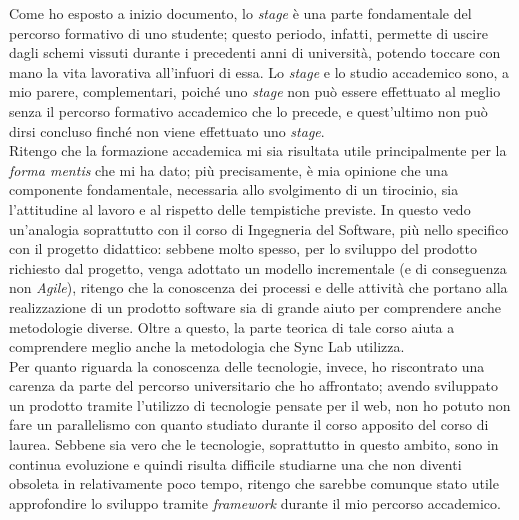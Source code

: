 Come ho esposto a inizio documento, lo \textit{stage} è una parte fondamentale del percorso formativo di uno studente; questo periodo, infatti, permette di uscire dagli schemi vissuti durante i precedenti anni di università, potendo toccare con mano la vita lavorativa all'infuori di essa. Lo \textit{stage} e lo studio accademico sono, a mio parere, complementari, poiché uno \textit{stage} non può essere effettuato al meglio senza il percorso formativo accademico che lo precede, e quest'ultimo non può dirsi concluso finché non viene effettuato uno \textit{stage}. \\
Ritengo che la formazione accademica mi sia risultata utile principalmente per la \textit{forma mentis} che mi ha dato; più precisamente, è mia opinione che una componente fondamentale, necessaria allo svolgimento di un tirocinio, sia l'attitudine al lavoro e al rispetto delle tempistiche previste. In questo vedo un'analogia soprattutto con il corso di Ingegneria del Software, più nello specifico con il progetto didattico: sebbene molto spesso, per lo sviluppo del prodotto richiesto dal progetto, venga adottato un modello incrementale (e di conseguenza non \textit{Agile}), ritengo che la conoscenza dei processi e delle attività che portano alla realizzazione di un prodotto software sia di grande aiuto per comprendere anche metodologie diverse. Oltre a questo, la parte teorica di tale corso aiuta a comprendere meglio anche la metodologia che Sync Lab utilizza. \\
Per quanto riguarda la conoscenza delle tecnologie, invece, ho riscontrato una carenza da parte del percorso universitario che ho affrontato; avendo sviluppato un prodotto tramite l'utilizzo di tecnologie pensate per il web, non ho potuto non fare un parallelismo con quanto studiato durante il corso apposito del corso di laurea. Sebbene sia vero che le tecnologie, soprattutto in questo ambito, sono in continua evoluzione e quindi risulta difficile studiarne una che non diventi obsoleta in relativamente poco tempo, ritengo che sarebbe comunque stato utile approfondire lo sviluppo tramite \textit{framework} durante il mio percorso accademico.


